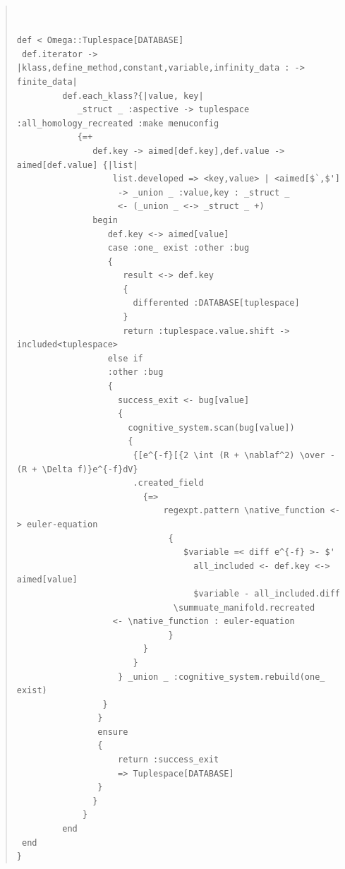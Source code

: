 \documentclass{jsarticle}
\begin{document}
\begin{quote}
\setlength{\baselineskip}{12pt}
\begin{verbatim}


def < Omega::Tuplespace[DATABASE] 
 def.iterator -> |klass,define_method,constant,variable,infinity_data : -> finite_data|
         def.each_klass?{|value, key|
            _struct _ :aspective -> tuplespace :all_homology_recreated :make menuconfig
            {=+
               def.key -> aimed[def.key],def.value -> aimed[def.value] {|list|
                   list.developed => <key,value> | <aimed[$`,$']
                    -> _union _ :value,key : _struct _ 
                    <- (_union _ <-> _struct _ +)
               begin
                  def.key <-> aimed[value]
                  case :one_ exist :other :bug
                  {
                     result <-> def.key
                     {
                       differented :DATABASE[tuplespace]
                     }
                     return :tuplespace.value.shift -> included<tuplespace>
                  else if
                  :other :bug 
                  { 
                    success_exit <- bug[value]
                    {
                      cognitive_system.scan(bug[value])
                      {
                       {[e^{-f}[{2 \int (R + \nablaf^2) \over -(R + \Delta f)}e^{-f}dV}
				       .created_field
                         {=>
                             regexpt.pattern \native_function <-> euler-equation
                              {
                                 $variable =< diff e^{-f} >- $'
                                   all_included <- def.key <-> aimed[value]
                                   $variable - all_included.diff
                               \summuate_manifold.recreated 
			       <- \native_function : euler-equation
                              }
                         }
                       }
                    } _union _ :cognitive_system.rebuild(one_ exist)
                 }
                }
                ensure
                {
                    return :success_exit
                    => Tuplespace[DATABASE]
                }
               } 
             }
         end
 end
}

\end{verbatim}
\end{quote}
\end{document}
